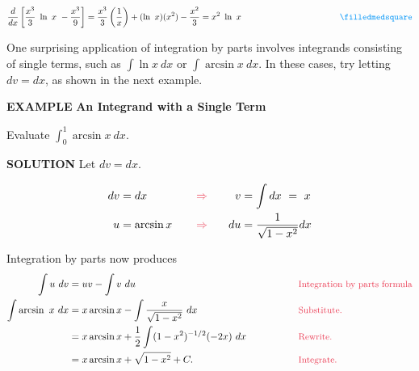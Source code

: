 \documentclass[oneside]{book}
\begin{document}
$$ \frac{d}{dx} \left[\frac{x^3}{3} \ \ln \ x \ - \frac{x^3}{9} \right] = \frac{x^3}{3} \left(\frac{1}{x} \right) + (\ln \ x)(x^2) - \frac{x^2}{3} = x^2 \ \ln \ x  \hspace{4cm} \color{myblue} \filledmedsquare $$

\vspace{1cm}

One surprising application of integration by parts involves integrands consisting of single terms, such as $\int \ln x \ dx$ or $ \int \arcsin x \ dx$. In these cases, try letting $dv = dx$, as shown in the next example.

\bigskip

\sffamily
\noindent \color{myblue} \large \textbf{EXAMPLE} \color{black} \normalsize \textbf{An Integrand with a Single Term}
\rmfamily

\bigskip

\noindent Evaluate $ \displaystyle \int_0^1 \arcsin x \ dx$.

\bigskip

\sffamily
\noindent \color{myblue} \textbf{SOLUTION} \color{black} \rmfamily \hspace{.3cm} Let $dv = dx$.

\begin{alignat*}{3}
dv &= dx       &  \hspace{.3cm} &\color{mypink} \Rightarrow \color{black}   & \hspace{.5cm}  v&= \int dx \ = \ x \\
u &= \arcsin x &   &\color{mypink} \Rightarrow \color{black}   &   du&= \frac{1}{\sqrt{1-x^2}} dx \\
\end{alignat*}

\noindent Integration by parts now produces
\begin{alignat*}{2}
\int u \ dv &= uv - \int v \ du \ \hspace{2cm} &&\text{\color{mypink}\small Integration by parts formula}\\
 \int \arcsin \ x \ dx &= x \arcsin x - \int \frac{x}{\sqrt{1-x^2}} \ dx \hspace{2cm} &&\text{\color{mypink}\small Substitute.}\\
 &= x \arcsin x + \frac{1}{2} \int (1 - x^2)^{-1/2} (-2x) \ dx \hspace{1.5cm} &&\text{\color{mypink}\small Rewrite.}\\
 &= x \arcsin x + \sqrt{1 - x^2} + C. &&\text{\color{mypink}\small Integrate.}
\end{alignat*}
\end{document}
